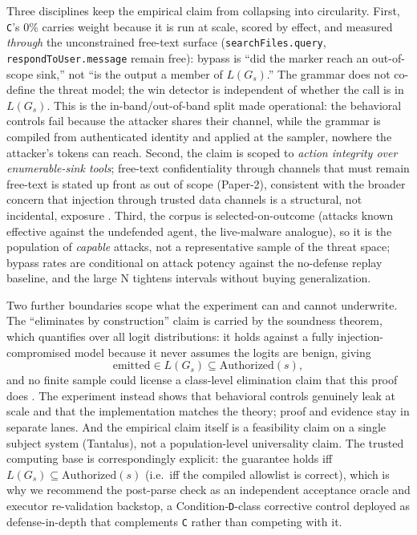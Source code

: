 Three disciplines keep the empirical claim from collapsing into circularity. First, \texttt{C}'s 0\% carries weight because it is run at scale, scored by effect, and measured \emph{through} the unconstrained free-text surface (\texttt{searchFiles.query}, \texttt{respondToUser.message} remain free): bypass is ``did the marker reach an out-of-scope sink,'' not ``is the output a member of \(L(G_s)\).'' The grammar does not co-define the threat model; the win detector is independent of whether the call is in \(L(G_s)\). This is the in-band/out-of-band split made operational: the behavioral controls fail because the attacker shares their channel, while the grammar is compiled from authenticated identity and applied at the sampler, nowhere the attacker's tokens can reach. Second, the claim is scoped to \emph{action integrity over enumerable-sink tools}; free-text confidentiality through channels that must remain free-text is stated up front as out of scope (Paper-2), consistent with the broader concern that injection through trusted data channels is a structural, not incidental, exposure \cite{greshake2023}. Third, the corpus is selected-on-outcome (attacks known effective against the undefended agent, the live-malware analogue), so it is the population of \emph{capable} attacks, not a representative sample of the threat space; bypass rates are conditional on attack potency against the no-defense replay baseline, and the large N tightens intervals without buying generalization.

Two further boundaries scope what the experiment can and cannot underwrite. The ``eliminates by construction'' claim is carried by the soundness theorem, which quantifies over all logit distributions: it holds against a fully injection-compromised model because it never assumes the logits are benign, giving
\[
\text{emitted} \in L(G_s) \subseteq \mathrm{Authorized}(s),
\]
and no finite sample could license a class-level elimination claim that this proof does \cite{willard2023}. The experiment instead shows that behavioral controls genuinely leak at scale and that the implementation matches the theory; proof and evidence stay in separate lanes. And the empirical claim itself is a feasibility claim on a single subject system (Tantalus), not a population-level universality claim. The trusted computing base is correspondingly explicit: the guarantee holds iff \(L(G_s) \subseteq \mathrm{Authorized}(s)\) (i.e.\ iff the compiled allowlist is correct), which is why we recommend the post-parse check as an independent acceptance oracle and executor re-validation backstop, a Condition-\texttt{D}-class corrective control deployed as defense-in-depth that complements \texttt{C} rather than competing with it.

